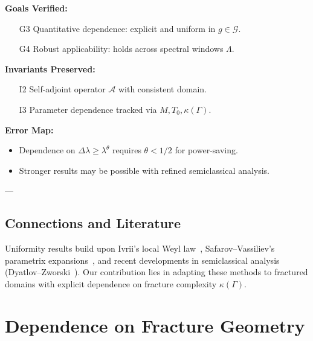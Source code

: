 \begin{auditblock}
\textbf{Goals Verified:}
\begin{itemize}
  \item[G3] Quantitative dependence: explicit and uniform in $g \in \mathcal{G}$.
  \item[G4] Robust applicability: holds across spectral windows $\Lambda$.
\end{itemize}

\textbf{Invariants Preserved:}
\begin{itemize}
  \item[I2] Self-adjoint operator $\mathcal{A}$ with consistent domain.
  \item[I3] Parameter dependence tracked via $M, T_0, \kappa(\Gamma)$.
\end{itemize}

\textbf{Error Map:}
\begin{itemize}
  \item Dependence on $\Delta\lambda \geq \lambda^\theta$ requires $\theta<1/2$ 
  for power-saving.
  \item Stronger results may be possible with refined semiclassical analysis.
\end{itemize}
\end{auditblock}

---

\subsection*{Connections and Literature}

Uniformity results build upon 
Ivrii’s local Weyl law~\cite{Ivrii1980}, 
Safarov–Vassiliev’s parametrix expansions~\cite{SafarovVassiliev1996}, 
and recent developments in semiclassical analysis 
(Dyatlov–Zworski~\cite{DyatlovZworski2019}).  
Our contribution lies in adapting these methods 
to fractured domains with explicit dependence on 
fracture complexity $\kappa(\Gamma)$.


\section{Dependence on Fracture Geometry}
\label{sec:fracture-geometry}

